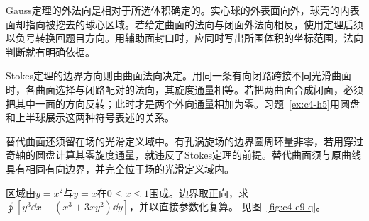 Gauss定理的外法向是相对于所选体积确定的。实心球的外表面向外，球壳的内表面却指向被挖去的球心区域。若给定曲面的法向与闭面外法向相反，使用定理后须以负号转换回题目方向。用辅助面封口时，应同时写出所围体积的坐标范围，法向判断就有明确依据。

Stokes定理的边界方向则由曲面法向决定。用同一条有向闭路跨接不同光滑曲面时，各曲面选择与闭路配对的法向，其旋度通量相等。若把两曲面合成闭面，必须把其中一面的方向反转；此时才是两个外向通量相加为零。习题~\ref{ex:c4-h5}用圆盘和上半球展示这两种符号表述的关系。

替代曲面还须留在场的光滑定义域中。有孔涡旋场的边界圆周环量非零，若用穿过奇轴的圆盘计算其零旋度通量，就违反了Stokes定理的前提。替代曲面须与原曲线具有相同有向边界，并完全位于场的光滑定义域内。

\begin{example}[两条曲线围成区域的环量]\label{ex:c4-e9}
区域由$y=x^2$与$y=x$在$0\le x\le1$围成。边界取正向，求$\oint[y^3\dd x+(x^3+3xy^2)\dd y]$，并以直接参数化复算。 见图~\ref{fig:c4-e9-q}。
\end{example}

